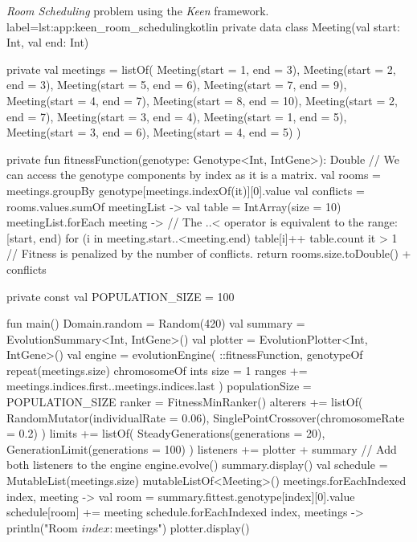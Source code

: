 \begin{code}{
  \textit{Room Scheduling} problem using the \textit{Keen} framework.
}{label=lst:app:keen_room_scheduling}{kotlin}
  private data class Meeting(val start: Int, val end: Int)

  private val meetings =
      listOf(
          Meeting(start = 1, end = 3),
          Meeting(start = 2, end = 3),
          Meeting(start = 5, end = 6),
          Meeting(start = 7, end = 9),
          Meeting(start = 4, end = 7),
          Meeting(start = 8, end = 10),
          Meeting(start = 2, end = 7),
          Meeting(start = 3, end = 4),
          Meeting(start = 1, end = 5),
          Meeting(start = 3, end = 6),
          Meeting(start = 4, end = 5)
      )
  
  private fun fitnessFunction(genotype: Genotype<Int, IntGene>): Double {
      // We can access the genotype components by index as it is a matrix.
      val rooms = meetings.groupBy { genotype[meetings.indexOf(it)][0].value }
      val conflicts = rooms.values.sumOf { meetingList ->
          val table = IntArray(size = 10)
          meetingList.forEach { meeting ->
              // The ..< operator is equivalent to the range: [start, end)
              for (i in meeting.start..<meeting.end) {
                  table[i]++
              }
          }
          table.count { it > 1 }
      }
      // Fitness is penalized by the number of conflicts.
      return rooms.size.toDouble() + conflicts
  }
  
  private const val POPULATION_SIZE = 100
  
  fun main() {
      Domain.random = Random(420)
      val summary = EvolutionSummary<Int, IntGene>()
      val plotter = EvolutionPlotter<Int, IntGene>()
      val engine = evolutionEngine(
          ::fitnessFunction,
          genotypeOf {
              repeat(meetings.size) {
                  chromosomeOf {
                      ints {
                          size = 1
                          ranges  += meetings.indices.first..meetings.indices.last
                      }
                  }
              }
          }) {
          populationSize = POPULATION_SIZE
          ranker = FitnessMinRanker()
          alterers += listOf(
            RandomMutator(individualRate = 0.06), SinglePointCrossover(chromosomeRate = 0.2)
          )
          limits += listOf(
            SteadyGenerations(generations = 20), GenerationLimit(generations = 100)
          )
          listeners += plotter + summary  // Add both listeners to the engine
      }
      engine.evolve()
      summary.display()
      val schedule = MutableList(meetings.size) { mutableListOf<Meeting>() }
      meetings.forEachIndexed { index, meeting ->
          val room = summary.fittest.genotype[index][0].value
          schedule[room] += meeting
      }
      schedule.forEachIndexed { index, meetings ->
          println("Room $index: $meetings")
      }
      plotter.display()
  }
\end{code}

